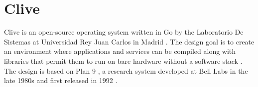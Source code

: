 \section{Clive}

Clive is an open-source operating system written in Go  by
the Laboratorio De Sistemas at Universidad Rey Juan Carlos
 in Madrid
\cite{hid-sp18-419-www-clive-lsub}. The design goal is to create an
environment where applications and services can be compiled along with
libraries that permit them to run on bare hardware without a software
stack \cite{hid-sp18-419-www-clive-lsub2014}. The design is based on
Plan 9  , a research system developed at Bell Labs
 in the late 1980s and first released in 1992
\cite{hid-sp18-419-www-about-plan9}.
